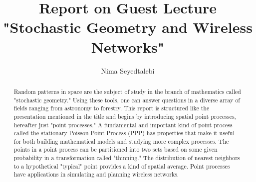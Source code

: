 \documentclass[]{article}
\title{Report on Guest Lecture "Stochastic Geometry and Wireless Networks"}
\author{Nima Seyedtalebi}
\begin{document}
\maketitle

\begin{abstract}
Random patterns in space are the subject of study in the branch of mathematics called "stochastic geometry." Using these tools, one can answer questions in a diverse array of fields ranging from astronomy to forestry. This report is structured like the presentation mentioned in the title and begins by introducing spatial point processes, hereafter just "point processes."  A fundamental and important kind of point process called the stationary Poisson Point Process (PPP) has properties that make it useful for both building mathematical models and studying more complex processes. The points in a point process can be partitioned into two sets based on some given probability in a transformation called "thinning." The distribution of nearest neighbors to a hypothetical "typical" point provides a kind of spatial average. Point processes have applications in simulating and planning wireless networks.
\end{abstract}

\section{}
\end{document}
